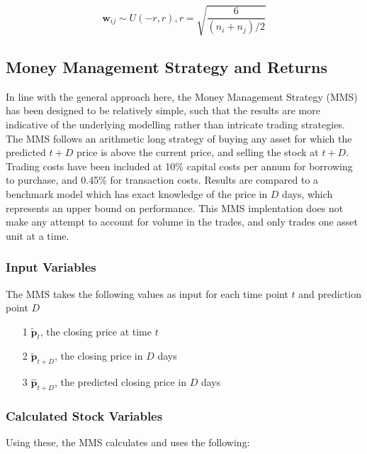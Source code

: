 \documentclass[a4paper,11pt,oneside]{article}
\theoremstyle{plain}
\theoremstyle{definition}
\begin{document}
	\begin{equation}
	\mathbf{w}_{ij} \sim U(-r, r), r = \sqrt{\frac{6}{(n_i + n_j)/2}}
	\end{equation}
	
	
	\subsection{Money Management Strategy and Returns}\label{imp_mms}
	
	In line with the general approach here, the Money Management Strategy (MMS) has been designed to be relatively simple, such that the results are more indicative of the underlying modelling rather than intricate trading strategies. The MMS follows an arithmetic long strategy of buying any asset for which the predicted ${t+D}$ price is above the current price, and selling the stock at ${t+D}$. Trading costs have been included at 10\% capital costs per annum for borrowing to purchase, and 0.45\% for transaction costs. Results are compared to a benchmark model which has exact knowledge of the price in $D$ days, which represents an upper bound on performance. This MMS implentation does not make any attempt to account for volume in the trades, and only trades one asset unit at a time.
	\hfill\break
	
	\subsubsection{Input Variables}
	
	The MMS takes the following values as input for each time point $t$  and prediction point $D$
	\begin{itemize}
		\item [1] {$\mathbf{\tilde{p}}_t$}, the closing price at time $t$
		\item [2] $\mathbf{\tilde{p}}_{t+D}$, the closing price in $D$ days
		\item [3] $\hat{\mathbf{p}}_{t+D}$, the predicted closing price in $D$ days
	\end{itemize}
	
	\subsubsection{Calculated Stock Variables}
	
	Using these, the MMS calculates and uses the following:
	
\end{document}
